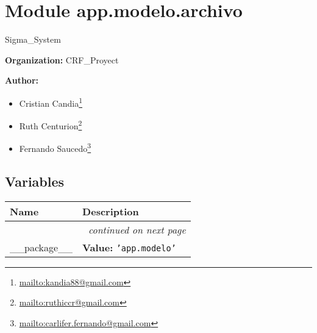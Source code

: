 %
%
%


\section{Module app.modelo.archivo}

    \label{app:modelo:archivo}
Sigma\_System

\textbf{Organization:} CRF\_Proyect



\textbf{Author:} \begin{itemize}
\setlength{\parskip}{0.6ex}
  \item Cristian 
    Candia\footnote{\href{mailto:kandia88@gmail.com}{mailto:kandia88@gmail.com}}

  \item Ruth 
    Centurion\footnote{\href{mailto:ruthiccr@gmail.com}{mailto:ruthiccr@gmail.com}}

  \item Fernando 
    Saucedo\footnote{\href{mailto:carlifer.fernando@gmail.com}{mailto:carlifer.fernando@gmail.com}}

\end{itemize}





  \subsection{Variables}

    \vspace{-1cm}
\hspace{\varindent}\begin{longtable}{|p{\varnamewidth}|p{\vardescrwidth}|l}
\cline{1-2}
\cline{1-2} \centering \textbf{Name} & \centering \textbf{Description}& \\
\cline{1-2}
\endhead\cline{1-2}\multicolumn{3}{r}{\small\textit{continued on next page}}\\\endfoot\cline{1-2}
\endlastfoot\raggedright \_\-\_\-p\-a\-c\-k\-a\-g\-e\-\_\-\_\- & \raggedright \textbf{Value:} 
{\tt \texttt{'}\texttt{app.modelo}\texttt{'}}&\\
\cline{1-2}
\end{longtable}


